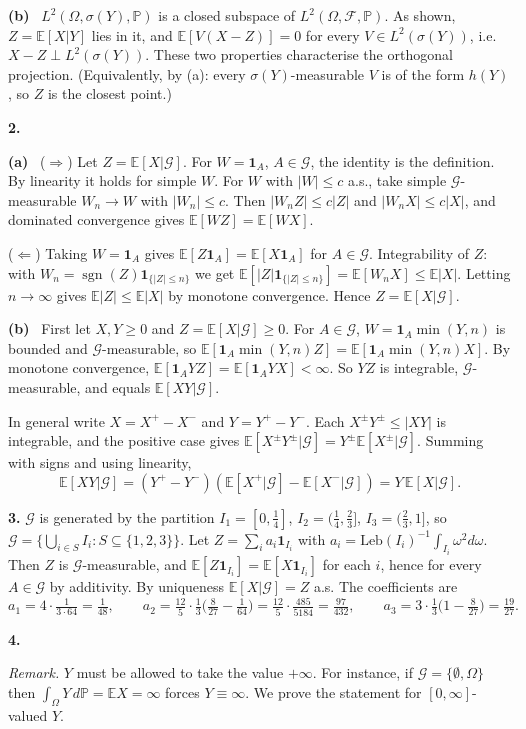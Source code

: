 \documentclass[11pt,a4paper]{article}
\newcommand{\E}{\mathbb{E}}
\renewcommand{\P}{\mathbb{P}}
\newcommand{\F}{\mathcal{F}}
\newcommand{\G}{\mathcal{G}}
\newcommand{\1}{\mathbf{1}}
\newcommand{\Leb}{\mathrm{Leb}}
\newcommand{\sgn}{\operatorname{sgn}}
\newcommand{\prob}[1]{\par\medskip\noindent\textbf{#1}\quad}
\newcommand{\sub}[1]{\par\smallskip\noindent\textbf{#1}\ }
\newcommand{\note}[1]{\par\noindent\emph{Remark.} #1}
\begin{document}
\sub{(b)} $L^2(\Omega,\sigma(Y),\P)$ is a closed subspace of $L^2(\Omega,\F,\P)$. As shown, $Z=\E[X|Y]$ lies in
it, and $\E[V(X-Z)]=0$ for every $V\in L^2(\sigma(Y))$, i.e.\ $X-Z\perp L^2(\sigma(Y))$. These two
properties characterise the orthogonal projection. (Equivalently, by (a): every $\sigma(Y)$-measurable $V$ is of the form $h(Y)$, so $Z$ is the closest point.)

\prob{2.}
\sub{(a)} ($\Rightarrow$) Let $Z=\E[X|\G]$. For $W=\1_A$, $A\in\G$, the identity is the definition. By linearity
it holds for simple $W$. For $W$ with $|W|\le c$ a.s., take simple $\G$-measurable $W_n\to W$ with $|W_n|\le c$.
Then $|W_nZ|\le c|Z|$ and $|W_nX|\le c|X|$, and dominated convergence gives $\E[WZ]=\E[WX]$.

($\Leftarrow$) Taking $W=\1_A$ gives $\E[Z\1_A]=\E[X\1_A]$ for $A\in\G$. Integrability of $Z$: with
$W_n=\sgn(Z)\1_{\{|Z|\le n\}}$ we get $\E[|Z|\1_{\{|Z|\le n\}}]=\E[W_nX]\le\E|X|$. Letting $n\to\infty$ gives $\E|Z|\le\E|X|$ by
monotone convergence. Hence $Z=\E[X|\G]$.

\sub{(b)} First let $X,Y\ge0$ and $Z=\E[X|\G]\ge0$. For $A\in\G$, $W=\1_A\min(Y,n)$ is bounded and
$\G$-measurable, so $\E[\1_A\min(Y,n)Z]=\E[\1_A\min(Y,n)X]$. By monotone convergence,
$\E[\1_AYZ]=\E[\1_AYX]<\infty$. So $YZ$ is integrable, $\G$-measurable, and equals $\E[XY|\G]$.

In general write $X=X^+-X^-$ and $Y=Y^+-Y^-$. Each $X^\pm Y^\pm\le|XY|$ is integrable, and the
positive case gives $\E[X^\pm Y^\pm|\G]=Y^\pm\E[X^\pm|\G]$. Summing with signs and using linearity,
\[\E[XY|\G]=(Y^+-Y^-)(\E[X^+|\G]-\E[X^-|\G])=Y\,\E[X|\G].\]

\prob{3.}
$\G$ is generated by the partition $I_1=[0,\frac14]$, $I_2=(\frac14,\frac23]$, $I_3=(\frac23,1]$, so
$\G=\{\bigcup_{i\in S}I_i:S\subseteq\{1,2,3\}\}$. Let $Z=\sum_ia_i\1_{I_i}$ with
$a_i=\Leb(I_i)^{-1}\int_{I_i}\omega^2d\omega$. Then $Z$ is $\G$-measurable, and $\E[Z\1_{I_i}]=\E[X\1_{I_i}]$ for each $i$, hence for
every $A\in\G$ by additivity. By uniqueness $\E[X|\G]=Z$ a.s. The coefficients are
\[
a_1=4\cdot\tfrac{1}{3\cdot64}=\tfrac1{48},\qquad
a_2=\tfrac{12}{5}\cdot\tfrac13\Big(\tfrac{8}{27}-\tfrac1{64}\Big)=\tfrac{12}{5}\cdot\tfrac{485}{5184}=\tfrac{97}{432},\qquad
a_3=3\cdot\tfrac13\Big(1-\tfrac{8}{27}\Big)=\tfrac{19}{27}.
\]

\prob{4.}
\note{$Y$ must be allowed to take the value $+\infty$. For instance, if $\G=\{\emptyset,\Omega\}$ then
$\int_\Omega Y\,d\P=\E X=\infty$ forces $Y\equiv\infty$. We prove the statement for $[0,\infty]$-valued $Y$.}
\end{document}

